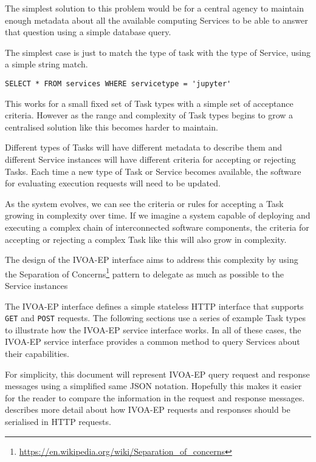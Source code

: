 \documentclass[11pt,a4paper]{ivoa}
\newcommand{\json} {JSON\xspace}
\newcommand{\ivoep} {IVOA-EP\xspace}
\newcommand{\codeword}[1] {\texttt{#1}}
\newcommand{\footurl}[1] {\footnote{\url{#1}}}
\begin{document}
The simplest solution to this problem would be for a central agency to maintain enough metadata about all the available computing Services to be able to answer that question using a simple database query.

The simplest case is just to match the type of task with the type of Service, using a simple string match.

\begin{verbatim}
SELECT * FROM services WHERE servicetype = 'jupyter'
\end{verbatim}

This works for a small fixed set of Task types with a simple set of acceptance criteria. However as the range and complexity of Task types begins to grow a centralised solution like this becomes harder to maintain.

Different types of Tasks will have different metadata to describe them and different Service instances will have different criteria for accepting or rejecting Tasks. Each time a new type of Task or Service becomes available, the software for evaluating execution requests will need to be updated.

As the system evolves, we can see the criteria or rules for accepting a Task growing in complexity over time. If we imagine a system capable of deploying and executing a complex chain of interconnected software components, the criteria for accepting or rejecting a complex Task like this will also grow in complexity.

The design of the \ivoep interface aims to address this complexity by using the Separation of Concerns\footurl{https://en.wikipedia.org/wiki/Separation_of_concerns} pattern to delegate as much as possible to the Service instances

The \ivoep interface defines a simple stateless HTTP interface that supports \codeword{GET} and \codeword{POST} requests.
The following sections use a series of example Task types to illustrate how the \ivoep service interface works.
In all of these cases, the \ivoep service interface provides a common method to query Services about their capabilities.

For simplicity, this document will represent \ivoep query request and response messages using a simplified same \json notation.
Hopefully this makes it easier for the reader to compare the information in the request and response messages.
 describes more detail about how \ivoep requests and responses should be serialised in HTTP requests.
\end{document}
